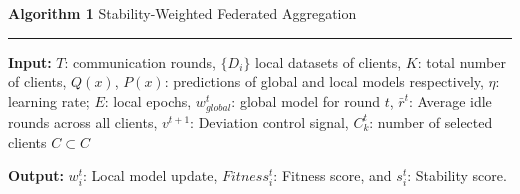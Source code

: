 \documentclass[pdflatex,sn-mathphys-num,oneside]{sn-jnl}%
\theoremstyle{thmstyleone}%
\theoremstyle{thmstyletwo}%
\theoremstyle{thmstylethree}%
\begin{document}
\noindent\textbf{Algorithm 1} Stability-Weighted Federated Aggregation
\par\noindent\rule{\linewidth}{0.4pt}
\vspace{1mm}

\noindent\textbf{Input:} $T$: communication rounds, $\{D_i\}$ local datasets of clients, $K$: total number of
clients, $Q(x)$, $P(x)$: predictions of global and local models respectively, $\eta$:
learning rate; $E$: local epochs, $w^t_{global}$: global model for round $t$, $\bar{r}^t$: Average idle
rounds across all clients, $v^{t+1}$: Deviation control signal, $C^t_k$: number of selected
clients $C \subset C$

\vspace{1mm}

\noindent\textbf{Output:} $w^t_i$: Local model update, $Fitness^t_i$: Fitness score, and $s^t_i$: Stability score.

\vspace{1mm}
\end{document}
